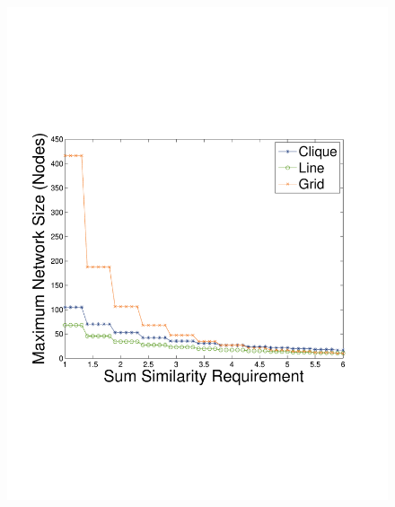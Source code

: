 \begin{figure}
{	\includegraphics[scale=0.22, clip=true, trim=14mm 65mm 25mm 65mm]{figures/use_cases_examples/num_nodes_vs_sum_sim_10_T_12_IS_color.pdf}
        \label{fig:use_case_num_nodes_vs_qoi}
        }
  \subfigure[Max Network Size vs. Timeliness (Sum Sim. = 5.0)]{
}
\end{figure}
